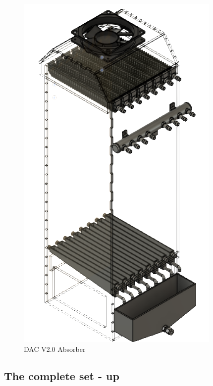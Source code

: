 \begin{appendices}
\begin{figure}[H]
    \centering
    \includegraphics[scale = 1.4]{images/mywork/Sprint4/DACV2Absorber.png}
    \caption{DAC V2.0 Absorber}
    \label{fig:dacv2abs}
\end{figure}

\subsection{The complete set - up}
\label{sec:setup2.0}


\end{appendices}
